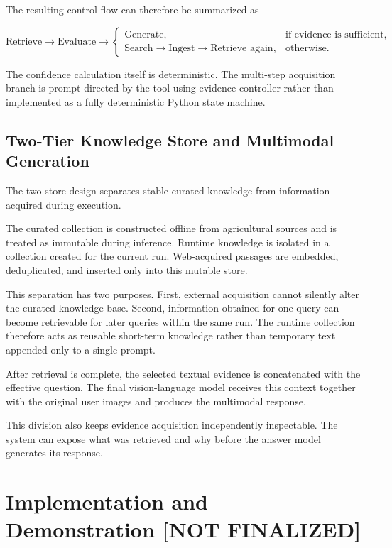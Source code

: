 \documentclass[runningheads]{llncs}
\begin{document}
The resulting control flow can therefore be summarized as

\[
\text{Retrieve}
\rightarrow
\text{Evaluate}
\rightarrow
\begin{cases}
\text{Generate}, & \text{if evidence is sufficient},\\
\text{Search} \rightarrow \text{Ingest} \rightarrow \text{Retrieve again},
& \text{otherwise}.
\end{cases}
\]

The confidence calculation itself is deterministic. The multi-step acquisition branch is prompt-directed by the tool-using evidence controller rather than implemented as a fully deterministic Python state machine.

\subsection{Two-Tier Knowledge Store and Multimodal Generation}

The two-store design separates stable curated knowledge from information acquired during execution.

The curated collection is constructed offline from agricultural sources and is treated as immutable during inference. Runtime knowledge is isolated in a collection created for the current run. Web-acquired passages are embedded, deduplicated, and inserted only into this mutable store.

This separation has two purposes. First, external acquisition cannot silently alter the curated knowledge base. Second, information obtained for one query can become retrievable for later queries within the same run. The runtime collection therefore acts as reusable short-term knowledge rather than temporary text appended only to a single prompt.

After retrieval is complete, the selected textual evidence is concatenated with the effective question. The final vision-language model receives this context together with the original user images and produces the multimodal response.

This division also keeps evidence acquisition independently inspectable. The system can expose what was retrieved and why before the answer model generates its response.

\section{Implementation and Demonstration [NOT FINALIZED]}
\end{document}

